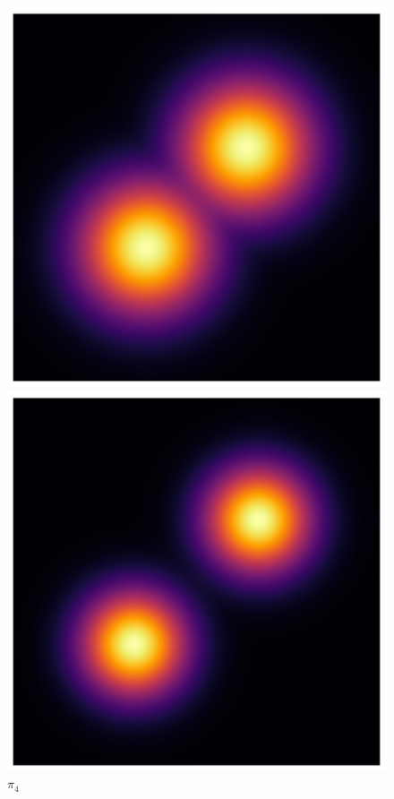 \begin{figure}[t]
\begin{minipage}{0.15\textwidth}
      \caption*{$\pi_3$}
    \end{minipage}
    \begin{minipage}{0.15\textwidth}
      \centering
      \includegraphics[width=\textwidth]{../img/heatmap_path_4.pdf}
      \caption*{$\pi_4$}
    \end{minipage}
    \begin{minipage}{0.15\textwidth}
      \centering
      \includegraphics[width=\textwidth]{../img/heatmap_path_5.pdf}

\end{minipage}
\end{figure}
